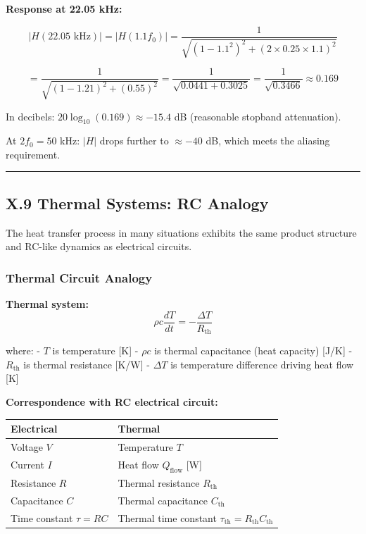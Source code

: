 \documentclass[
]{article}
\begin{document}
\textbf{Response at 22.05 kHz:}

\[|H(22.05\text{ kHz})| = |H(1.1 f_0)| = \frac{1}{\sqrt{(1 - 1.1^2)^2 + (2 \times 0.25 \times 1.1)^2}}\]

\[= \frac{1}{\sqrt{(1 - 1.21)^2 + (0.55)^2}} = \frac{1}{\sqrt{0.0441 + 0.3025}} = \frac{1}{\sqrt{0.3466}} \approx 0.169\]

In decibels: \(20\log_{10}(0.169) \approx -15.4\) dB (reasonable
stopband attenuation).

At \(2f_0 = 50\) kHz: \(|H|\) drops further to \(\approx -40\) dB, which
meets the aliasing requirement.

\begin{center}\rule{0.5\linewidth}{0.5pt}\end{center}

\subsection{X.9 Thermal Systems: RC
Analogy}\label{x.9-thermal-systems-rc-analogy}

The heat transfer process in many situations exhibits the same product
structure and RC-like dynamics as electrical circuits.

\subsubsection{Thermal Circuit Analogy}\label{thermal-circuit-analogy}

\textbf{Thermal system:}
\[\rho c \frac{dT}{dt} = -\frac{\Delta T}{R_{\text{th}}}\]

where: - \(T\) is temperature {[}K{]} - \(\rho c\) is thermal
capacitance (heat capacity) {[}J/K{]} - \(R_{\text{th}}\) is thermal
resistance {[}K/W{]} - \(\Delta T\) is temperature difference driving
heat flow {[}K{]}

\textbf{Correspondence with RC electrical circuit:}

\begin{longtable}[]{@{}
  >{\raggedright\arraybackslash}p{}
  >{\raggedright\arraybackslash}p{}@{}}
\toprule\noalign{}
\begin{minipage}[b]{\linewidth}\raggedright
Electrical
\end{minipage} & \begin{minipage}[b]{\linewidth}\raggedright
Thermal
\end{minipage} \\
\midrule\noalign{}
\endhead
\bottomrule\noalign{}
\endlastfoot
Voltage \(V\) & Temperature \(T\) \\
Current \(I\) & Heat flow \(Q_{\text{flow}}\) {[}W{]} \\
Resistance \(R\) & Thermal resistance \(R_{\text{th}}\) \\
Capacitance \(C\) & Thermal capacitance \(C_{\text{th}}\) \\
Time constant \(\tau = RC\) & Thermal time constant
\(\tau_{\text{th}} = R_{\text{th}}C_{\text{th}}\) \\
\end{longtable}
\end{document}
